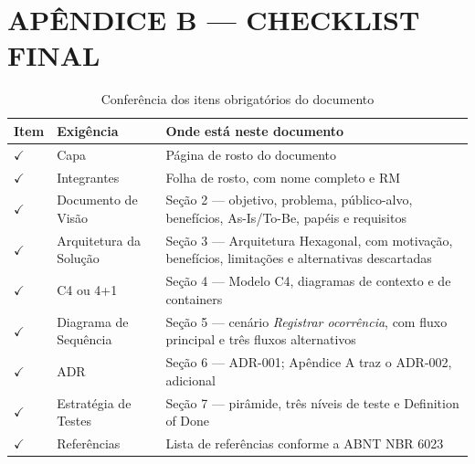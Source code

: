 \documentclass[12pt,a4paper,oneside]{article}
\newcommand{\fonte}[1]{\par\vspace{5pt}{\footnotesize\singlespacing Fonte: #1\par}}
\newcommand{\cab}[1]{\textbf{\footnotesize #1}}
\newcommand{\marcado}{$\checkmark$}
\begin{document}
\newpage
{}
{}
\section*{APÊNDICE B — CHECKLIST FINAL}
\vspace{0.6\baselineskip}

\begin{table}[H]
\centering
\caption{Conferência dos itens obrigatórios do documento}
\label{tab:checklist}
{\small\singlespacing
\begin{tabularx}{\textwidth}{C{1.6cm} L{4.4cm} X}
\toprule
\cab{Item} & \cab{Exigência} & \cab{Onde está neste documento} \\
\midrule
\marcado & Capa & Página de rosto do documento \\
\marcado & Integrantes & Folha de rosto, com nome completo e RM \\
\marcado & Documento de Visão & Seção 2 — objetivo, problema, público-alvo,
benefícios, As-Is/To-Be, papéis e requisitos \\
\marcado & Arquitetura da Solução & Seção 3 — Arquitetura Hexagonal, com motivação,
benefícios, limitações e alternativas descartadas \\
\marcado & C4 ou 4+1 & Seção 4 — Modelo C4, diagramas de contexto e de containers \\
\marcado & Diagrama de Sequência & Seção 5 — cenário \emph{Registrar ocorrência},
com fluxo principal e três fluxos alternativos \\
\marcado & ADR & Seção 6 — ADR-001; Apêndice A traz o ADR-002, adicional \\
\marcado & Estratégia de Testes & Seção 7 — pirâmide, três níveis de teste e
Definition of Done \\
\marcado & Referências & Lista de referências conforme a ABNT NBR 6023 \\
\bottomrule
\end{tabularx}}
\fonte{elaborado pelos autores (2026), conforme o checklist final da GS2026.2.}
\end{table}
\end{document}

